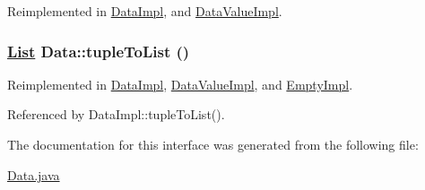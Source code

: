Reimplemented in \hyperlink{classDataImpl_a3}{Data\-Impl}, and \hyperlink{classDataValueImpl_a1}{Data\-Value\-Impl}.\hypertarget{interfaceData_a1}{
\subsubsection[tupleToList]{\setlength{\rightskip}{0pt plus 5cm}\hyperlink{interfaceList}{List} Data::tuple\-To\-List ()}}
\label{interfaceData_a1}




Reimplemented in \hyperlink{classDataImpl_a1}{Data\-Impl}, \hyperlink{classDataValueImpl_a2}{Data\-Value\-Impl}, and \hyperlink{classEmptyImpl_a3}{Empty\-Impl}.

Referenced by Data\-Impl::tuple\-To\-List().



The documentation for this interface was generated from the following file:\begin{CompactItemize}
\item 
\hyperlink{Data_8java-source}{Data.java}\end{CompactItemize}
